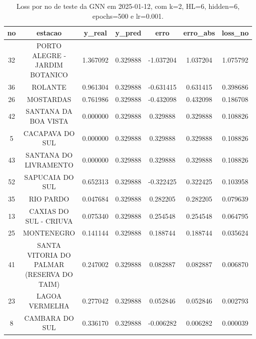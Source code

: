 \begin{table}[h]
\centering
\caption{Loss por no de teste da GNN em 2025-01-12, com k=2, HL=6, hidden=6, epochs=500 e lr=0.001.}
\label{tab:gnn_loss_k2_hl6_h6_e500_d20250112}
\begin{tabular}{ccccccc}
\toprule
no & estacao & y\_real & y\_pred & erro & erro\_abs & loss\_no \\
\midrule
32 & PORTO ALEGRE - JARDIM BOTANICO & 1.367092 & 0.329888 & -1.037204 & 1.037204 & 1.075792 \\
36 & ROLANTE & 0.961304 & 0.329888 & -0.631415 & 0.631415 & 0.398686 \\
26 & MOSTARDAS & 0.761986 & 0.329888 & -0.432098 & 0.432098 & 0.186708 \\
42 & SANTANA DA BOA VISTA & 0.000000 & 0.329888 & 0.329888 & 0.329888 & 0.108826 \\
5 & CACAPAVA DO SUL & 0.000000 & 0.329888 & 0.329888 & 0.329888 & 0.108826 \\
43 & SANTANA DO LIVRAMENTO & 0.000000 & 0.329888 & 0.329888 & 0.329888 & 0.108826 \\
52 & SAPUCAIA DO SUL & 0.652313 & 0.329888 & -0.322425 & 0.322425 & 0.103958 \\
35 & RIO PARDO & 0.047684 & 0.329888 & 0.282205 & 0.282205 & 0.079639 \\
13 & CAXIAS DO SUL - CRIUVA & 0.075340 & 0.329888 & 0.254548 & 0.254548 & 0.064795 \\
25 & MONTENEGRO & 0.141144 & 0.329888 & 0.188744 & 0.188744 & 0.035624 \\
41 & SANTA VITORIA DO PALMAR (RESERVA DO TAIM) & 0.247002 & 0.329888 & 0.082887 & 0.082887 & 0.006870 \\
23 & LAGOA VERMELHA & 0.277042 & 0.329888 & 0.052846 & 0.052846 & 0.002793 \\
8 & CAMBARA DO SUL & 0.336170 & 0.329888 & -0.006282 & 0.006282 & 0.000039 \\
\bottomrule
\end{tabular}
\end{table}
